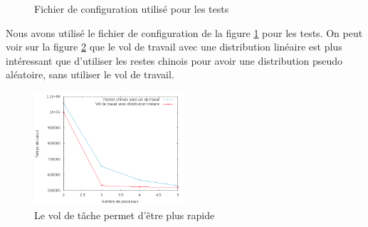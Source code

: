 \begin{figure}[H]
\centering

\caption{Fichier de configuration utilisé pour les tests}
\label{fig:conf}
\end{figure}
Nous avons utilisé le fichier de configuration de la figure \ref{fig:conf} pour les tests.
On peut voir sur la figure \ref{comp_chinois_vol} que le vol de travail avec une distribution linéaire est plus intéressant que d'utiliser les restes chinois pour avoir une distribution pseudo aléatoire, sans utiliser le vol de travail.
\begin{figure}[H]
\centering
\includegraphics[width=0.5\textwidth]{comp_chinois_vol.png}
\caption{Le vol de tâche permet d'être plus rapide}
\label{comp_chinois_vol}
\end{figure}
